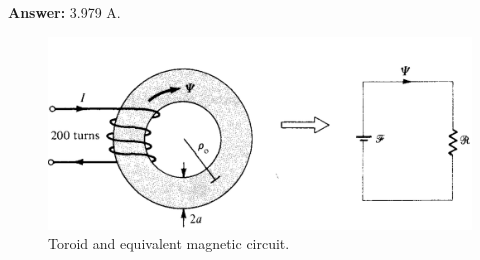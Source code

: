 \documentclass[12pt,a4paper]{article}
\begin{document}
\textbf{Answer:} 3.979 A.
\begin{figure}[H]
\centering
\includegraphics[scale=0.4]{Figure8-26S.png}
\caption{Toroid and equivalent magnetic circuit.}
\label{Toroid-and-equivalent-circuit}
\end{figure}


\end{document}
